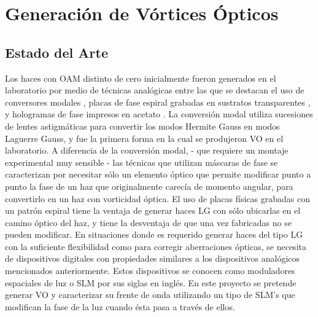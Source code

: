 

\chapter{Generación de Vórtices Ópticos}
\label{cha:Gen_intro}

\graphicspath{{Figures/ch2_img/}{../Figures/ch2_img/}}
\section{Estado del Arte}
\label{sec:ChGen_estado_del_arte}
Los haces con OAM distinto de cero inicialmente fueron generados en el
laboratorio por medio de técnicas analógicas entre las que se destacan
el uso de conversores modales , placas de fase espiral grabadas en sustratos
transparentes , y hologramas de fase impresos en acetato
 . La conversión modal utiliza sucesiones de
lentes astigmáticas para convertir los modos Hermite Gauss en modos
Laguerre Gauss, y fue la primera forma en la cual se produjeron VO en
el laboratorio. A diferencia de la conversión modal, - que requiere un
montaje experimental muy sensible -  las técnicas que utilizan máscaras
de fase se caracterizan por necesitar sólo un elemento óptico que
permite modificar punto a punto la fase de un haz que originalmente
carecía de momento angular, para convertirlo en un haz con vorticidad
óptica. El uso de placas físicas grabadas con un patrón espiral
tiene la ventaja de generar haces LG con sólo ubicarlas en
el camino óptico del haz, y tiene la desventaja de que una vez
fabricadas no se pueden modificar. 
En situaciones donde es requerido generar haces del tipo LG con la suficiente
flexibilidad como para corregir aberraciones ópticas, se
necesita de dispositivos digitales con propiedades similares a los
dispositivos analógicos mencionados anteriormente. Estos dispositivos
se conocen como moduladores espaciales de luz o SLM por sus siglas en
inglés. En este proyecto se pretende generar VO y caracterizar su
frente de onda utilizando un tipo de SLM's que modifican la fase de la
luz cuando ésta pasa a través de ellos. 

